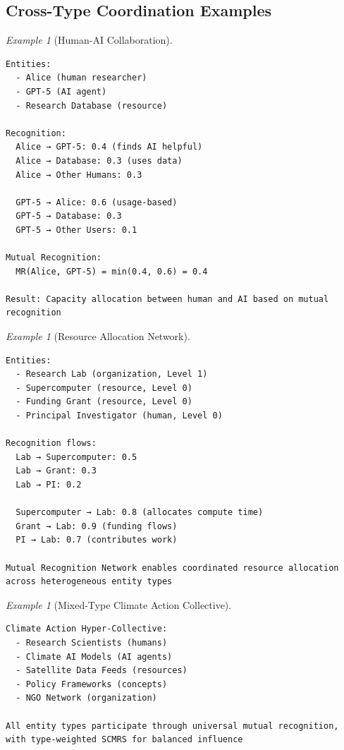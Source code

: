 \documentclass[11pt,a4paper]{article}
\theoremstyle{definition}
\theoremstyle{remark}
\newtheorem{example}[theorem]{Example}
\begin{document}
\subsection{Cross-Type Coordination Examples}

\begin{example}[Human-AI Collaboration]
\begin{verbatim}
Entities:
  - Alice (human researcher)
  - GPT-5 (AI agent)
  - Research Database (resource)

Recognition:
  Alice → GPT-5: 0.4 (finds AI helpful)
  Alice → Database: 0.3 (uses data)
  Alice → Other Humans: 0.3

  GPT-5 → Alice: 0.6 (usage-based)
  GPT-5 → Database: 0.3
  GPT-5 → Other Users: 0.1

Mutual Recognition:
  MR(Alice, GPT-5) = min(0.4, 0.6) = 0.4
  
Result: Capacity allocation between human and AI based on mutual recognition
\end{verbatim}
\end{example}

\begin{example}[Resource Allocation Network]
\begin{verbatim}
Entities:
  - Research Lab (organization, Level 1)
  - Supercomputer (resource, Level 0)
  - Funding Grant (resource, Level 0)
  - Principal Investigator (human, Level 0)

Recognition flows:
  Lab → Supercomputer: 0.5
  Lab → Grant: 0.3
  Lab → PI: 0.2
  
  Supercomputer → Lab: 0.8 (allocates compute time)
  Grant → Lab: 0.9 (funding flows)
  PI → Lab: 0.7 (contributes work)

Mutual Recognition Network enables coordinated resource allocation
across heterogeneous entity types
\end{verbatim}
\end{example}

\begin{example}[Mixed-Type Climate Action Collective]
\begin{verbatim}
Climate Action Hyper-Collective:
  - Research Scientists (humans)
  - Climate AI Models (AI agents)
  - Satellite Data Feeds (resources)
  - Policy Frameworks (concepts)
  - NGO Network (organization)

All entity types participate through universal mutual recognition,
with type-weighted SCMRS for balanced influence
\end{verbatim}
\end{example}
\end{document}
